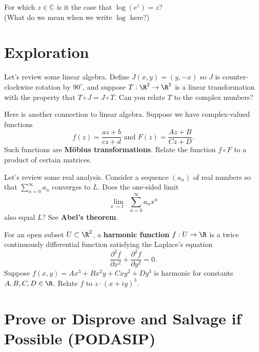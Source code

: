 \documentclass{homework}
\begin{document}
\begin{problem}
  For which $z \in \mathbb{C}$ is it the case that $\log \left( e^z \right) = z$?  \\ (What do we mean when we write $\log$ here?)
\end{problem}

\section{Exploration}

\begin{problem}\label{tj-versus-jt}
  Let's review some linear algebra.  Define $J(x,y) = (y,-x)$ so $J$
  is counter-clockwise rotation by $90^\circ$, and suppose
  $T : \R^2 \to \R^2$ is a linear transformation with the property
  that $T \circ J = J \circ T$.  Can you relate $T$ to the complex
  numbers?
\end{problem}

\begin{problem}\label{mobius-transformations}Here is another connection to linear algebra.  Suppose we have complex-valued functions
  \[
    f(z) = \frac{az + b}{cz + d} \mbox{ and }
    F(z) = \frac{Az + B}{Cz + D}.
  \]
  Such functions are \textbf{M\"obius transformations}.  Relate the
  function $f \circ F$ to a product of certain matrices.
\end{problem}

\begin{problem}\label{abels-theorem}Let's review some real analysis.
  Consider a sequence $(a_n)$ of real numbers so that
  $\sum_{n=0}^\infty a_n$ converges to $L$.  Does the one-sided limit
  \[
    \lim_{x \to 1^{-}} \sum_{n=0}^\infty a_n x^n
  \]
  also equal $L$?  See \textbf{Abel's theorem}.
\end{problem}

\begin{problem}\label{harmonic-function}
  For an open subset $U \subset \R^2$, a \textbf{harmonic function} $f : U \to \R$ is a twice continuously differential function satisfying the Laplace's equation
  \[
    \frac{\partial^2 f}{\partial x^2} + \frac{\partial^2 f}{\partial y^2} = 0.
  \]
  Suppose $f(x,y) = Ax^3 + Bx^2 y + C xy^2 + D y^3$ is harmonic for constants $A, B, C, D \in \R$.  Relate $f$ to $z \cdot (x + iy)^3$.
\end{problem}

\section{Prove or Disprove and Salvage if Possible (PODASIP)}
\end{document}

